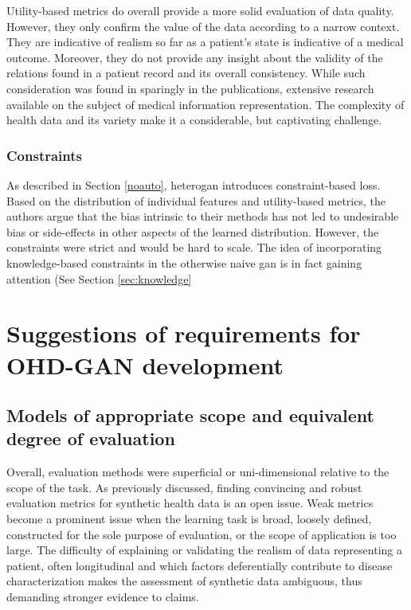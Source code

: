 Utility-based metrics do overall provide a more solid evaluation of data quality. However, they only confirm the value of the data according to a narrow context. They are indicative of realism so far as a patient's state is indicative of a medical outcome. Moreover, they do not provide any insight about the validity of the relations found in a patient record and its overall consistency. While such consideration was found in sparingly in the publications, extensive research available on the subject of medical information representation. The complexity of health data and its variety make it a considerable, but captivating challenge.\par

\subsubsection{Constraints}
As described in Section \ref{noauto}, \gls{heterogan} introduces constraint-based loss. Based on the distribution of individual features and utility-based metrics, the authors argue that the bias intrinsic to their methods has not led to undesirable bias or side-effects in other aspects of the learned distribution. However, the constraints were strict and would be hard to scale. The idea of incorporating knowledge-based constraints in the otherwise naive \gls{gan} is in fact gaining attention (See Section \ref{sec:knowledge} \par

\section{Suggestions of requirements for OHD-GAN development}

\subsection{Models of appropriate scope and equivalent degree of evaluation}\label{sec:basic}
Overall, evaluation methods were superficial or uni-dimensional relative to the scope of the task. As previously discussed, finding convincing and robust evaluation metrics for synthetic health data is an open issue. Weak metrics become a prominent issue when the learning task is broad, loosely defined, constructed for the sole purpose of evaluation, or the scope of application is too large. The difficulty of explaining or validating the realism of data representing a patient, often longitudinal and which factors deferentially contribute to disease characterization makes the assessment of synthetic data ambiguous, thus demanding stronger evidence to claims.\par

